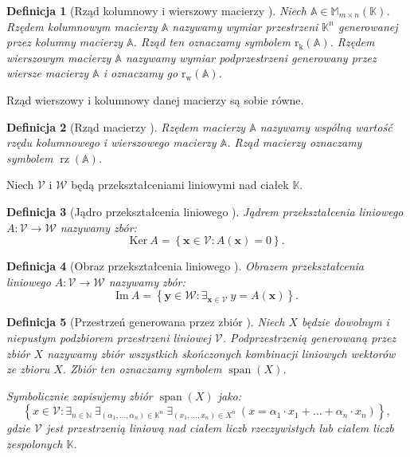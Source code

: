 \documentclass[12pt,a4paper]{report}
\newtheorem{df}{Definicja}[chapter]
\newcommand{\set}[1]{\left\lbrace {#1} \right\rbrace}
\newcommand{\setK}{\mathbb{K}}
\newcommand{\setN}{\mathbb{N}}
\newcommand{\przestrzen}[1]{\operatorname{span}\left({#1} \right)}
\newcommand{\rw}[1]{\operatorname{r_w}\left({#1} \right)}
\newcommand{\rk}[1]{\operatorname{r_k}\left({#1} \right)}
\newcommand{\rz}[1]{\operatorname{rz}\left({#1} \right)}
\begin{document}
\begin{df}[Rząd kolumnowy i wierszowy macierzy {\citep[Sec 8.1]{alzega}}]
Niech $\mathbb{A} \in \mathbb{M}_{m\times n}(\setK)$. Rzędem kolumnowym macierzy $\mathbb{A}$ nazywamy wymiar przestrzeni $\setK^n$ generowanej przez kolumny macierzy $\mathbb{A}$. Rząd ten oznaczamy symbolem $\rk{\mathbb{A}}$. Rzędem wierszowym macierzy $\mathbb{A}$ nazywamy wymiar podprzestrzeni generowany przez wiersze macierzy $\mathbb{A}$ i oznaczamy go $\rw{\mathbb{A}}$.
\end{df}

Rząd wierszowy i kolumnowy danej macierzy są sobie równe. 

\begin{df}[Rząd macierzy {\citep[Sec 8.1]{alzega}}]
Rzędem macierzy $\mathbb{A}$ nazywamy wspólną wartość rzędu kolumnowego i wierszowego macierzy $\mathbb{A}$. Rząd macierzy oznaczamy symbolem $\rz{\mathbb{A}}$.
\end{df}

Niech $\mathcal{V}$ i $\mathcal{W}$ będą przekształceniami liniowymi nad ciałek $\setK$.
\begin{df}[Jądro przekształcenia liniowego {\citep[Sec 8.1]{alzega}}]
Jądrem przekształcenia liniowego $A: \mathcal{V}\to \mathcal{W}$ nazywamy zbór:
$$
\mathrm{Ker} \: A = \set{ \mathbf{x} \in \mathcal{V} : A(\mathbf{x}) = 0}.
$$
\end{df}

\begin{df}[Obraz przekształcenia liniowego {\citep[Sec 8.1]{alzega}}]
Obrazem przekształcenia liniowego $A: \mathcal{V}\to \mathcal{W}$ nazywamy zbór:
$$
\mathrm{Im} \: A = \set{ \mathbf{y} \in \mathcal{W} : \exists_{\mathbf{x} \in \mathcal{V}} \: y = A(\mathbf{x})}.
$$
\end{df}

\begin{df}[Przestrzeń generowana przez zbiór {\citep[Sec 7.1 Def 7.13]{alzega}}]
Niech $\mathit{X}$ będzie dowolnym i niepustym podzbiorem przestrzeni liniowej $\mathcal{V}$. Podprzestrzenią generowaną przez zbiór $\mathit{X}$ nazywamy zbiór wszystkich  skończonych kombinacji liniowych wektorów ze zbioru $\mathit{X}$. Zbiór ten oznaczamy symbolem $\przestrzen{\mathit{X}}$.

Symbolicznie zapisujemy zbiór $\przestrzen{\mathit{X}}$ jako:
$$
\set{x \in \mathcal{V} : \exists_{n \in \setN} \: \exists_{(\alpha_1, \ldots, \alpha_n) \in \setK^n } \: \exists_{(x_1, \ldots, x_n) \in \mathit{X}^n} \: (x = \alpha_1 \cdot x_1 + \ldots + \alpha_n \cdot x_n)},
$$
gdzie $\mathcal{V}$ jest przestrzenią liniową nad ciałem liczb rzeczywistych lub ciałem liczb zespolonych $\setK$.
\end{df}
\end{document}
